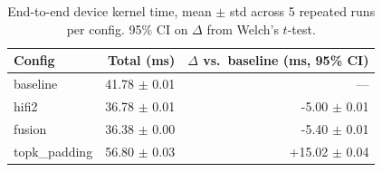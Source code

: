 \begin{table}[h]
\centering
\small
\caption{End-to-end device kernel time, mean $\pm$ std across 5 repeated runs per config. 95\% CI on $\Delta$ from Welch's $t$-test.}
\label{tab:variance}
\begin{tabular}{lrr}
\toprule
Config & Total (ms) & $\Delta$ vs.\ baseline (ms, 95\% CI) \\
\midrule
baseline & 41.78 $\pm$ 0.01 & --- \\
hifi2 & 36.78 $\pm$ 0.01 & -5.00 $\pm$ 0.01 \\
fusion & 36.38 $\pm$ 0.00 & -5.40 $\pm$ 0.01 \\
topk_padding & 56.80 $\pm$ 0.03 & +15.02 $\pm$ 0.04 \\
\bottomrule
\end{tabular}
\end{table}

